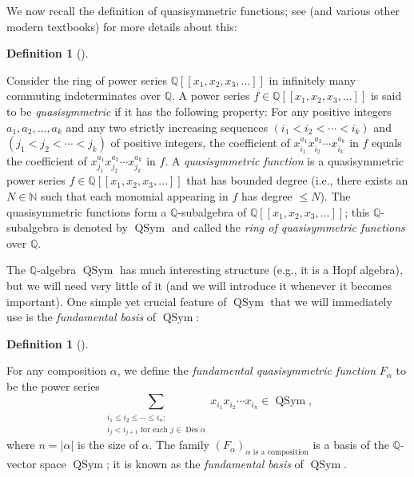 \documentclass[numbers=enddot,12pt,final,onecolumn,notitlepage]{scrartcl}%
\theoremstyle{definition}
\newtheorem{defi}[theo]{Definition}
\newenvironment{definition}[1][]
{\begin{defi}[#1]\begin{leftbar}}
{\end{leftbar}\end{defi}}
\let\sumnonlimits\sum
\renewcommand{\sum}{\sumnonlimits\limits}
\begin{document}
We now recall the definition of quasisymmetric functions; see \cite[Chapter
5]{HopfComb} (and various other modern textbooks) for more details about this:

\begin{definition}
Consider the ring of power series $\mathbb{Q}\left[  \left[  x_{1},x_{2}%
,x_{3},\ldots\right]  \right]  $ in infinitely many commuting indeterminates
over $\mathbb{Q}$. A power series $f\in\mathbb{Q}\left[  \left[  x_{1}%
,x_{2},x_{3},\ldots\right]  \right]  $ is said to be \textit{quasisymmetric}
if it has the following property: For any positive integers $a_{1}%
,a_{2},\ldots,a_{k}$ and any two strictly increasing sequences $\left(
i_{1}<i_{2}<\cdots<i_{k}\right)  $ and $\left(  j_{1}<j_{2}<\cdots
<j_{k}\right)  $ of positive integers, the coefficient of $x_{i_{1}}^{a_{1}%
}x_{i_{2}}^{a_{2}}\cdots x_{i_{k}}^{a_{k}}$ in $f$ equals the coefficient of
$x_{j_{1}}^{a_{1}}x_{j_{2}}^{a_{2}}\cdots x_{j_{k}}^{a_{k}}$ in $f$. A
\textit{quasisymmetric function} is a quasisymmetric power series
$f\in\mathbb{Q}\left[  \left[  x_{1},x_{2},x_{3},\ldots\right]  \right]  $
that has bounded degree (i.e., there exists an $N\in\mathbb{N}$ such that each
monomial appearing in $f$ has degree $\leq N$). The quasisymmetric functions
form a $\mathbb{Q}$-subalgebra of $\mathbb{Q}\left[  \left[  x_{1},x_{2}%
,x_{3},\ldots\right]  \right]  $; this $\mathbb{Q}$-subalgebra is denoted by
$\operatorname*{QSym}$ and called the \textit{ring of quasisymmetric
functions} over $\mathbb{Q}$.
\end{definition}

The $\mathbb{Q}$-algebra $\operatorname*{QSym}$ has much interesting structure
(e.g., it is a Hopf algebra), but we will need very little of it (and we will
introduce it whenever it becomes important). One simple yet crucial feature of
$\operatorname*{QSym}$ that we will immediately use is the \textit{fundamental
basis} of $\operatorname*{QSym}$:

\begin{definition}
For any composition $\alpha$, we define the \textit{fundamental quasisymmetric
function} $F_{\alpha}$ to be the power series%
\[
\sum_{\substack{i_{1}\leq i_{2}\leq\cdots\leq i_{n};\\i_{j}<i_{j+1}\text{ for
each }j\in\operatorname*{Des}\alpha}}x_{i_{1}}x_{i_{2}}\cdots x_{i_{n}}%
\in\operatorname*{QSym},
\]
where $n=\left\vert \alpha\right\vert $ is the size of $\alpha$. The family
$\left(  F_{\alpha}\right)  _{\alpha\text{ is a composition}}$ is a basis of
the $\mathbb{Q}$-vector space $\operatorname*{QSym}$; it is known as the
\textit{fundamental basis} of $\operatorname*{QSym}$.
\end{definition}
\end{document}
